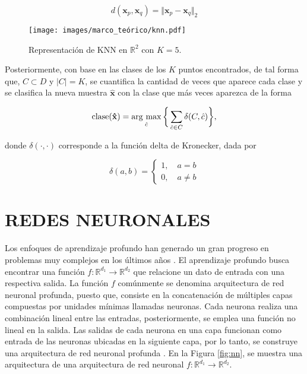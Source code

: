 \begin{equation}
    d(\mathbf{x}_p,\mathbf{x}_q) = \Vert \mathbf{x}_p-\mathbf{x}_q \Vert_2
    \label{eq:distancia_euclidiana}
\end{equation}

\begin{figure}[H]
    \centering
    \caption{\hspace{2mm}Representación de KNN en $\mathbb{R}^2$ con $K = 5$.}
    \texttt{[image: images/marco\_teórico/knn.pdf]}
    \label{fig:knn}
\end{figure}

Posteriormente, con base en las clases de los $K$ puntos encontrados, de tal forma que, $C \subset D$ y $\vert C \vert = K$, se cuantifica la cantidad de veces que aparece cada clase y se clasifica la nueva muestra $\mathbf{\hat{x}}$ con la clase que más veces aparezca de la forma

\begin{equation}
    \mathrm{clase}(\mathbf{\hat{x}}) =  \operatorname*{arg \ max}_{\hat{c}} \bigg\{ \sum_{\hat{c} \in C} \delta(C,\hat{c})\bigg\},
\end{equation}

donde $\delta(\cdot,\cdot)$ corresponde a la función delta de Kronecker, dada por

\begin{equation}
    \delta(a,b) = \begin{cases}
        1, \quad a = b \\
        0, \quad a \neq b
    \end{cases}
\end{equation}
\section{REDES NEURONALES}

Los enfoques de aprendizaje profundo han generado un gran progreso en problemas muy complejos en los últimos años
. El aprendizaje profundo busca encontrar una función $f: \mathbb{R}^{d_1} \rightarrow \mathbb{R}^{d_2}$ que relacione un dato de entrada con una respectiva salida. La función $f$ comúnmente se denomina arquitectura de red neuronal profunda, puesto que, consiste en la concatenación de múltiples capas compuestas por unidades mínimas llamadas neuronas. Cada neurona realiza una combinación lineal entre las entradas, posteriormente, se emplea una función no lineal en la salida. Las salidas de cada neurona en una capa funcionan como entrada de las neuronas ubicadas en la siguiente capa, por lo tanto, se construye una arquitectura de red neuronal profunda . En la Figura \ref{fig:nn}, se muestra una arquitectura de una arquitectura de red neuronal $f: \mathbb{R}^{d_1} \rightarrow \mathbb{R}^{d_2}$.


